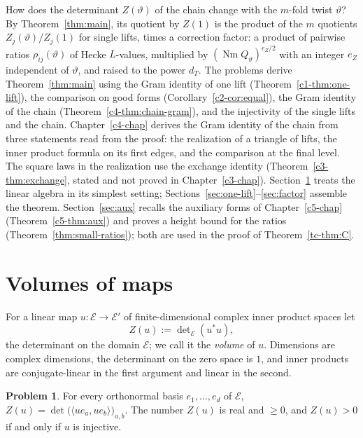 \documentclass[reqno]{amsart}
\newcounter{chap}
\theoremstyle{definition}
\newtheorem{problem}{Problem}[section]
\theoremstyle{plain}
\newcommand{\Nm}{\operatorname{Nm}}
\begin{document}
How does the determinant \(Z(\vartheta)\) of the chain change with the \(m\)-fold twist \(\vartheta\)?  By Theorem~\ref{thm:main}, its quotient by \(Z(1)\) is the product of the \(m\) quotients \(Z_j(\vartheta)/Z_j(1)\) for single lifts, times a correction factor: a product of pairwise ratios \(\rho_{ij}(\vartheta)\) of Hecke \(L\)-values, multiplied by \((\Nm Q_\vartheta)^{e_Z/2}\) with an integer \(e_Z\) independent of \(\vartheta\), and raised to the power \(d_T\).  The problems derive Theorem~\ref{thm:main} using the Gram identity of one lift (Theorem~\ref{c1-thm:one-lift}), the comparison on good forms (Corollary~\ref{c2-cor:equal}), the Gram identity of the chain (Theorem~\ref{c4-thm:chain-gram}), and the injectivity of the single lifts and the chain.  Chapter~\ref{c4-chap} derives the Gram identity of the chain from three statements read from the proof: the realization of a triangle of lifts, the inner product formula on its first edges, and the comparison at the final level.  The square laws in the realization use the exchange identity (Theorem~\ref{c3-thm:exchange}, stated and not proved in Chapter~\ref{c3-chap}).  Section~\ref{sec:volumes} treats the linear algebra in its simplest setting; Sections~\ref{sec:one-lift}--\ref{sec:factor} assemble the theorem.  Section~\ref{sec:aux} recalls the auxiliary forms of Chapter~\ref{c5-chap} (Theorem~\ref{c5-thm:aux}) and proves a height bound for the ratios (Theorem~\ref{thm:small-ratios}); both are used in the proof of Theorem~\ref{tc-thm:C}.

\section{Volumes of maps}\label{sec:volumes}

For a linear map \(u \colon \mathcal E \to \mathcal E'\) of finite-dimensional complex inner product spaces let
\[
  Z(u) := \det\nolimits_{\mathcal E} (u^* u) ,
\]
the determinant on the domain \(\mathcal E\); we call it the \emph{volume} of \(u\).  Dimensions are complex dimensions, the determinant on the zero space is \(1\), and inner products are conjugate-linear in the first argument and linear in the second.

\begin{problem}\label{pr:gram}
For every orthonormal basis \(e_1, \dots, e_d\) of \(\mathcal E\), \(Z(u) = \det\bigl(\langle u e_a, u e_b \rangle\bigr)_{a,b}\).  The number \(Z(u)\) is real and \(\ge 0\), and \(Z(u) > 0\) if and only if \(u\) is injective.
\end{problem}
\end{document}
